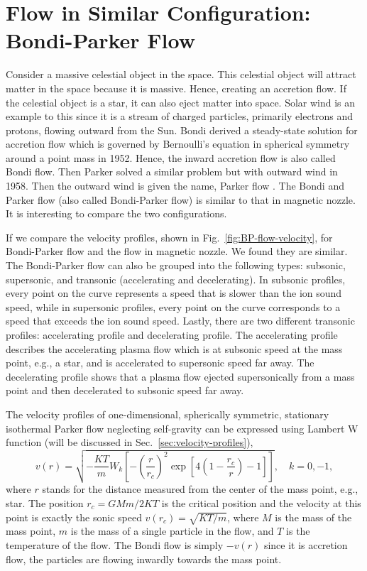 \section{Flow in Similar Configuration: Bondi-Parker Flow}
Consider a massive celestial object in the space. This celestial object will attract matter in the space because it is massive. Hence, creating an accretion flow. If the celestial object is a star, it can also eject matter into space. Solar wind is an example to this since it is a stream of charged particles, primarily electrons and protons, flowing outward from the Sun. Bondi derived a steady-state solution for accretion flow which is governed by Bernoulli's equation in spherical symmetry around a point mass in 1952. Hence, the inward accretion flow is also called Bondi flow. Then Parker solved a similar problem but with outward wind in 1958. Then the outward wind is given the name, Parker flow \cite{aikawa_stability_1979,bondi_spherically_1952,keto_stability_2020}. The Bondi and Parker flow (also called Bondi-Parker flow) is similar to that in magnetic nozzle. It is interesting to compare the two configurations.

If we compare the velocity profiles, shown in Fig.~\ref{fig:BP-flow-velocity}, for Bondi-Parker flow and the flow in magnetic nozzle. We found they are similar. The Bondi-Parker flow can also be grouped into the following types: subsonic, supersonic, and transonic (accelerating and decelerating). In subsonic profiles, every point on the curve represents a speed that is slower than the ion sound speed, while in supersonic profiles, every point on the curve corresponds to a speed that exceeds the ion sound speed. Lastly, there are two different transonic profiles: accelerating profile and decelerating profile. The accelerating profile describes the accelerating plasma flow which is at subsonic speed at the mass point, e.g., a star, and is accelerated to supersonic speed far away. The decelerating profile shows that a plasma flow ejected supersonically from a mass point and then decelerated to subsonic speed far away.

The velocity profiles of one-dimensional, spherically symmetric, stationary isothermal Parker flow neglecting self-gravity can be expressed using Lambert W function (will be discussed in Sec.~\ref{sec:velocity-profiles}),
\begin{equation}
	v(r) = \sqrt{-\frac{KT}{m}W_k\left[ -\left(\frac{r}{r_c}\right)^2 \exp\left[4\left(1-\frac{r_c}{r}\right)-1\right] \right]}, \quad
	k = 0,-1,
\end{equation}
where $r$ stands for the distance measured from the center of the mass point, e.g., star. The position $r_c=GMm/2KT$ is the critical position and the velocity at this point is exactly the sonic speed $v(r_c)=\sqrt{KT/m}$, where $M$ is the mass of the mass point, $m$ is the mass of a single particle in the flow, and $T$ is the temperature of the flow. The Bondi flow is simply $-v(r)$ since it is accretion flow, the particles are flowing inwardly towards the mass point.

